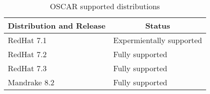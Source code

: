%
%
%

\begin{table}[htbp]
  \begin{center}
    \begin{tabular}{|l|p{3in}|}
      \hline
      \multicolumn{1}{|c|}{Distribution and Release} &
      \multicolumn{1}{|c|}{Status} \\
      \hline
      \hline
      RedHat 7.1 & Expermientally supported \\
%
      RedHat 7.2 & Fully supported \\
%
      RedHat 7.3 & Fully supported \\
%
\hline
%
      Mandrake 8.2 & Fully supported \\
      \hline
    \end{tabular}
    \caption{OSCAR supported distributions}
    \label{tab:oscar-distro-support}
  \end{center}
\end{table}
